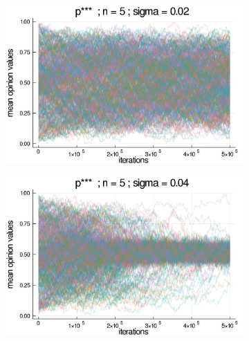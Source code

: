 \documentclass{article}
\begin{document}
    \begin{figure}[H]
      \centering
      \begin{subfigure}[b]{0.48\textwidth}
        \includegraphics[width=\textwidth]{img/series/tseries2/Poodlcalculatepsssn5-rho005-sigma002-00intransrandom.png}
      \end{subfigure}

      \begin{subfigure}[b]{0.48\textwidth}
        \includegraphics[width=\textwidth]{img/series/tseries2/Poodlcalculatepsssn5-rho005-sigma004-00intransrandom.png}
      \end{subfigure}


\end{figure}
\end{document}
